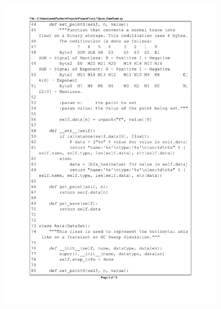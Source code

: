 \begin{figure}[H]
\centering
\includegraphics[scale=0.9]{01_Pre_textuais/code/leitura2.pdf}
\end{figure}


